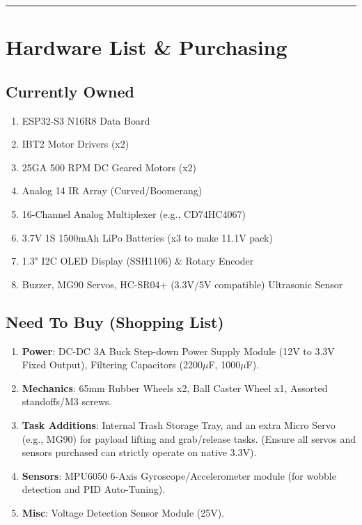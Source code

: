 \documentclass[12pt,a4paper]{article}
\begin{document}
\vspace{1em}
\hrule
\vspace{1em}

\section{Hardware List \& Purchasing}

\subsection*{Currently Owned}
\begin{enumerate}
    \item ESP32-S3 N16R8 Data Board
    \item IBT2 Motor Drivers (x2)
    \item 25GA 500 RPM DC Geared Motors (x2)
    \item Analog 14 IR Array (Curved/Boomerang)
    \item 16-Channel Analog Multiplexer (e.g., CD74HC4067)
    \item 3.7V 1S 1500mAh LiPo Batteries (x3 to make 11.1V pack)
    \item 1.3" I2C OLED Display (SSH1106) \& Rotary Encoder
    \item Buzzer, MG90 Servos, HC-SR04+ (3.3V/5V compatible) Ultrasonic Sensor
\end{enumerate}

\subsection*{Need To Buy (Shopping List)}
\begin{enumerate}
    \item \textbf{Power}: DC-DC 3A Buck Step-down Power Supply Module (12V to 3.3V Fixed Output), Filtering Capacitors (2200$\mu$F, 1000$\mu$F).
    \item \textbf{Mechanics}: 65mm Rubber Wheels x2, Ball Caster Wheel x1, Assorted standoffs/M3 screws.
    \item \textbf{Task Additions}: Internal Trash Storage Tray, and an extra Micro Servo (e.g., MG90) for payload lifting and grab/release tasks. (Ensure all servos and sensors purchased can strictly operate on native 3.3V).
    \item \textbf{Sensors}: MPU6050 6-Axis Gyroscope/Accelerometer module (for wobble detection and PID Auto-Tuning).
    \item \textbf{Misc}: Voltage Detection Sensor Module (25V).
\end{enumerate}
\end{document}
